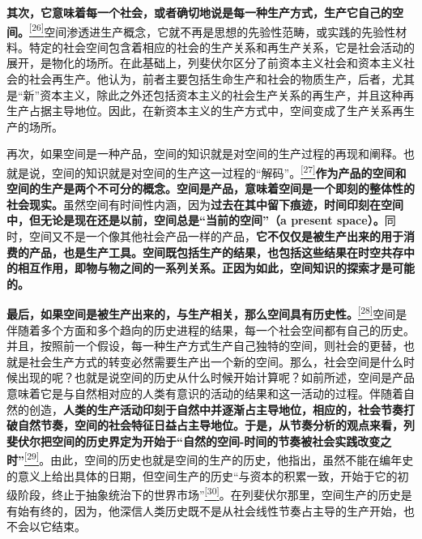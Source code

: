 \documentclass[UTF8, fontset = sourcesans, a4paper, oneside, zihao =
-4, scheme=chinese, no-math, space=true]{ctexbook}
\begin{document}
\textbf{其次，它意味着每一个社会，或者确切地说是每一种生产方式，生产它自己的空间。}\protect\hypertarget{part0006_split_002.htmlux5cux23w26}{}{}\protect\hyperlink{part0006_split_003.htmlux5cux23m26}{\textsuperscript{{[}26{]}}}空间渗透进生产概念，它就不再是思想的先验性范畴，或实践的先验性材料。特定的社会空间包含着相应的社会的生产关系和再生产关系，它是社会活动的展开，是物化的场所。在此基础上，列斐伏尔区分了前资本主义社会和资本主义社会的社会再生产。他认为，前者主要包括生命生产和社会的物质生产，后者，尤其是``新''资本主义，除此之外还包括资本主义的社会生产关系的再生产，并且这种再生产占据主导地位。因此，在新资本主义的生产方式中，空间变成了生产关系再生产的场所。

再次，如果空间是一种产品，空间的知识就是对空间的生产过程的再现和阐释。也就是说，空间的知识就是对空间的生产这一过程的``解码''。\protect\hypertarget{part0006_split_002.htmlux5cux23w27}{}{}\protect\hyperlink{part0006_split_003.htmlux5cux23m27}{\textsuperscript{{[}27{]}}}\textbf{作为产品的空间和空间的生产是两个不可分的概念。空间是产品，意味着空间是一个即刻的整体性的社会现实。}虽然空间有时间性内涵，因为\textbf{过去在其中留下痕迹，时间印刻在空间中，但无论是现在还是以前，空间总是``当前的空间''（a
present
space）。}同时，空间又不是一个像其他社会产品一样的产品，\textbf{它不仅仅是被生产出来的用于消费的产品，也是生产工具。空间既包括生产的结果，也包括这些结果在时空共存中的相互作用，即物与物之间的一系列关系。正因为如此，空间知识的探索才是可能的。}

\textbf{最后，如果空间是被生产出来的，与生产相关，那么空间具有历史性。}\protect\hypertarget{part0006_split_002.htmlux5cux23w28}{}{}\protect\hyperlink{part0006_split_003.htmlux5cux23m28}{\textsuperscript{{[}28{]}}}空间是伴随着多个方面和多个趋向的历史进程的结果，每一个社会空间都有自己的历史。并且，按照前一个假设，每一种生产方式生产自己独特的空间，则社会的更替，也就是社会生产方式的转变必然需要生产出一个新的空间。那么，社会空间是什么时候出现的呢？也就是说空间的历史从什么时候开始计算呢？如前所述，空间是产品意味着它是与自然相对应的人类有意识的活动的结果和这一活动的过程。伴随着自然的创造，\textbf{人类的生产活动印刻于自然中并逐渐占主导地位，相应的，社会节奏打破自然节奏，空间的社会特征日益占主导地位。于是，从节奏分析的观点来看，列斐伏尔把空间的历史界定为开始于``自然的空间-时间的节奏被社会实践改变之时''}\protect\hypertarget{part0006_split_002.htmlux5cux23w29}{}{}\protect\hyperlink{part0006_split_003.htmlux5cux23m29}{\textsuperscript{{[}29{]}}}。由此，空间的历史也就是空间的生产的历史，他指出，虽然不能在编年史的意义上给出具体的日期，但空间生产的历史``与资本的积累一致，开始于它的初级阶段，终止于抽象统治下的世界市场''\protect\hypertarget{part0006_split_002.htmlux5cux23w30}{}{}\protect\hyperlink{part0006_split_003.htmlux5cux23m30}{\textsuperscript{{[}30{]}}}。在列斐伏尔那里，空间生产的历史是有始有终的，因为，他深信人类历史既不是从社会线性节奏占主导的生产开始，也不会以它结束。
\end{document}

